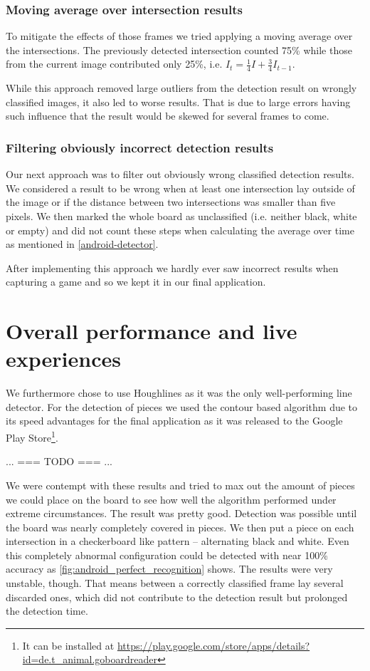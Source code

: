 	\subsubsection{Moving average over intersection results}
	To mitigate the effects of those frames we tried applying a moving average over the intersections. The previously detected intersection counted 75\% while those from the current image contributed only 25\%, i.e. $I_t = \frac{1}{4}I + \frac{3}{4}I_{t-1}$.

	While this approach removed large outliers from the detection result on wrongly classified images, it also led to worse results. That is due to large errors having such influence that the result would be skewed for several frames to come.

	\subsubsection{Filtering obviously incorrect detection results}
	Our next approach was to filter out obviously wrong classified detection results. We considered a result to be wrong when at least one intersection lay outside of the image or if the distance between two intersections was smaller than five pixels. We then marked the whole board as unclassified (i.e. neither black, white or empty) and did not count these steps when calculating the average over time as mentioned in \autoref{android-detector}.

	After implementing this approach we hardly ever saw incorrect results when capturing a game and so we kept it in our final application.





	\section{Overall performance and live experiences}
	We furthermore chose to use Houghlines as it was the only well-performing line detector. For the detection of pieces we used the contour based algorithm due to its speed advantages for the final application as it was released to the Google Play Store\footnote{It can be installed at \url{https://play.google.com/store/apps/details?id=de.t_animal.goboardreader}}.

	... === TODO === ...

	We were contempt with these results and tried to max out the amount of pieces we could place on the board to see how well the algorithm performed under extreme circumstances. The result was pretty good. Detection was possible until the board was nearly completely covered in pieces. We then put a piece on each intersection in a checkerboard like pattern -- alternating black and white. Even this completely abnormal configuration could be detected with near 100\% accuracy as \autoref{fig:android_perfect_recognition} shows. The results were very unstable, though. That means between a correctly classified frame lay several discarded ones, which did not contribute to the detection result but prolonged the detection time.

